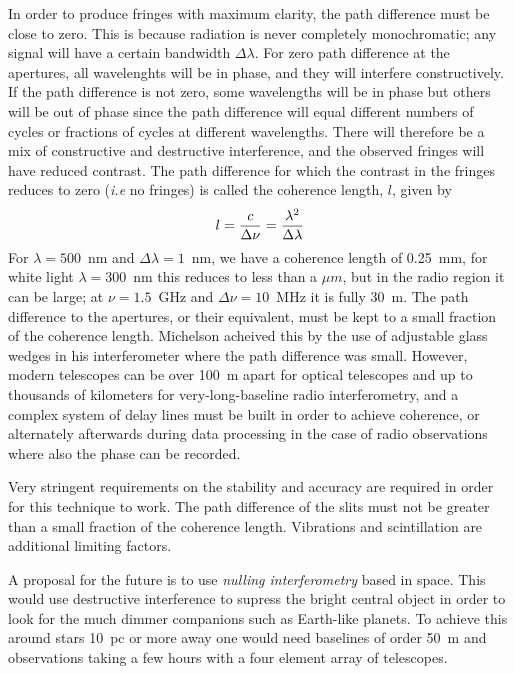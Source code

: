 In order to produce fringes with maximum clarity, the path difference must be close to zero. This is because radiation is never completely monochromatic; any signal will have a certain bandwidth $\Delta\lambda$. For zero path difference at the apertures, all wavelenghts will be in phase, and they will interfere constructively. If the path difference is not zero, some wavelengths will be in phase but others will be out of phase since the path difference will equal different numbers of cycles or fractions of cycles at different wavelengths. There will therefore be a mix of constructive and destructive interference, and the observed fringes will have reduced contrast. The path difference for which the contrast in the fringes reduces to zero ({\it i.e} no fringes) is called the coherence length, $l$, given by
\[
l={c\over\Delta\nu}={\lambda^2\over\Delta\lambda}
\]
\noindent
For $\lambda=500$~nm and $\Delta\lambda=1$~nm, we have a coherence length of
0.25~mm, for white light $\lambda=300$~nm this reduces to less than a $\mu m$, but in the radio region it can be large; at $\nu=1.5$~GHz and $\Delta\nu=10$~MHz it is fully 30~m. The path difference to the apertures, or their equivalent, must be kept to a small fraction of the coherence length. Michelson acheived this by the use of adjustable glass wedges in his interferometer where the path difference was small. However, modern telescopes can be over 100~m apart for optical telescopes and up to thousands of kilometers for very-long-baseline radio interferometry, and a complex system of delay lines must be built in order to achieve coherence, or alternately afterwards during data processing in the case of radio observations where also the phase can be recorded.

Very stringent requirements on the stability and accuracy are required in order for this technique to work. The path difference of the slits must not be greater than a small fraction of the coherence length. %
Vibrations and scintillation are additional limiting factors.

A proposal for the future is to use {\it nulling interferometry} based in space. This would use destructive interference to supress the bright central object in order to look for the much dimmer companions such as Earth-like planets. To achieve this around stars 10~pc or more away one would need baselines of order 50~m and observations taking a few hours with a four element array of telescopes.

